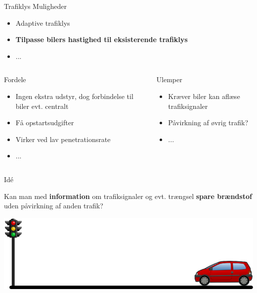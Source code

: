 \begin{frame}{Trafiklys}
Muligheder
\begin{itemize}
\item Adaptive trafiklys
\item \textbf{Tilpasse bilers hastighed til eksisterende trafiklys}
\item ...
\end{itemize}


\begin{center}
\begin{columns}
\begin{column}{0.5\textwidth}
Fordele
\begin{itemize}
\item Ingen ekstra udstyr, dog forbindelse til biler evt. centralt
\item Få opstartsudgifter 
\item Virker ved lav penetrationsrate
\item ...
\end{itemize}
\end{column}

\begin{column}{0.5\textwidth}
Ulemper
\begin{itemize}
\item Kræver biler kan aflæse trafiksignaler
\item Påvirkning af øvrig trafik?
\item ...
\end{itemize}
\end{column}
\end{columns}
\end{center}
\end{frame}

\begin{frame}{Idé}
\begin{center}
Kan man med \textbf{information} om trafiksignaler og evt. trængsel \textbf{spare brændstof} uden påvirkning af anden trafik?
\end{center}
\includegraphics[width=1\textwidth]{images/figure.png}
\end{frame}



